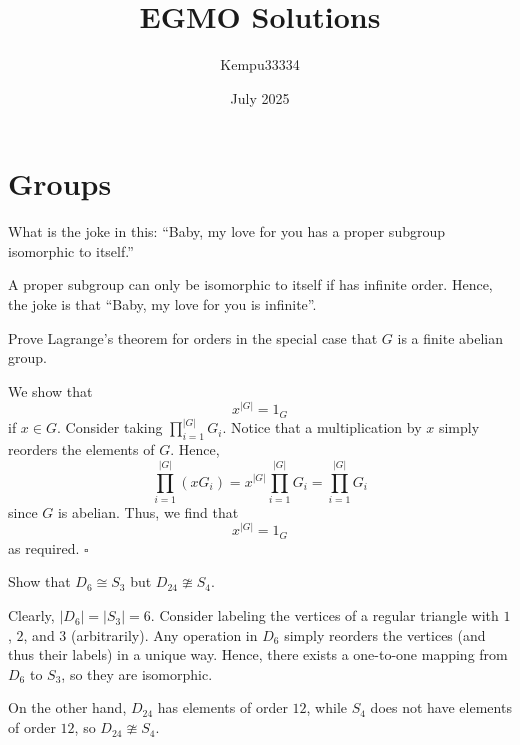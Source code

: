 \documentclass{article}
\title{EGMO Solutions}
\author{Kempu33334}
\date{July 2025}
\begin{document}
\maketitle

\tableofcontents

\newpage

\section{Groups}

\begin{problem}[1.A]
What is the joke in this: ``Baby, my love for you has a proper subgroup isomorphic to itself.''
\end{problem}
A proper subgroup can only be isomorphic to itself if has infinite order. Hence, the joke is that ``Baby, my love for you is infinite''.

\begin{problem}[1.B]
Prove Lagrange's theorem for orders in the special case that $G$ is a finite abelian group.
\end{problem}
We show that \[x^{|G|} = 1_G\] if $x \in G$. Consider taking $\prod_{i=1}^{|G|}G_i$. Notice that a multiplication by $x$ simply reorders the elements of $G$. Hence, \[\prod_{i=1}^{|G|}(xG_i) = x^{|G|}\prod_{i=1}^{|G|}G_i = \prod_{i=1}^{|G|}G_i\] since $G$ is abelian. Thus, we find that \[x^{|G|} = 1_G\] as required. $\square$

\begin{problem}[1.C]
Show that $D_6 \cong S_3$ but $D_{24} \ncong S_4$.
\end{problem}
Clearly, $|D_6| = |S_3| = 6$. Consider labeling the vertices of a regular triangle with $1$, $2$, and $3$ (arbitrarily). Any operation in $D_6$ simply reorders the vertices (and thus their labels) in a unique way. Hence, there exists a one-to-one mapping from $D_6$ to $S_3$, so they are isomorphic.

On the other hand, $D_{24}$ has elements of order $12$, while $S_4$ does not have elements of order $12$, so $D_{24} \ncong S_4$.
\end{document}
